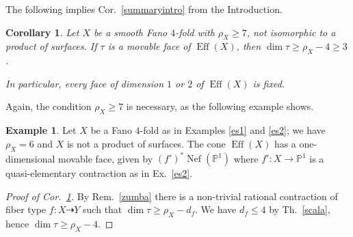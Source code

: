 \documentclass[a4paper,12pt]{amsart}
\newtheorem{corollary}[thm]{Corollary}
\theoremstyle{definition}
\newtheorem{example}[thm]{Example}
\numberwithin{figure}{section}
\numberwithin{table}{section}
\newcommand{\pr}{\mathbb{P}}
\newcommand{\Eff}{\operatorname{Eff}}
\newcommand{\Nef}{\operatorname{Nef}}
\begin{document}
The following implies Cor.~\ref{summaryintro} from the Introduction.
\begin{corollary}\label{summary}
 Let $X$ be a smooth Fano $4$-fold with $\rho_X\geq 7$, not isomorphic to a product of surfaces.
  If $\tau$ is a movable face of $\Eff(X)$, then 
  $\dim\tau\geq\rho_X-4\geq 3$.

  In particular, every face of dimension $1$ or $2$ of $\Eff(X)$ is fixed.
\end{corollary}
Again, the condition $\rho_X\geq 7$ is necessary, as the following example shows.
\begin{example}\label{perone}
Let $X$ be a Fano $4$-fold as in Examples \ref{es1} and \ref{es2}; we have $\rho_X=6$ and $X$ is not a product of surfaces. The cone $\Eff(X)$ has a one-dimensional movable face, given by $(f')^*\Nef(\pr^1)$ where $f'\colon X\to\pr^1$ is a quasi-elementary contraction as in Ex.~\ref{es2}.
\end{example}
\begin{proof}[Proof of Cor.~\ref{summary}]
By Rem.~\ref{zumba} there is  a non-trivial rational contraction of fiber type 
$f\colon X\dasharrow Y$
such that $\dim\tau\geq \rho_X-d_f$. We have 
$d_f\leq 4$ by Th.~\ref{scala},  hence $\dim\tau\geq\rho_X-4$.
\end{proof}
\end{document}
